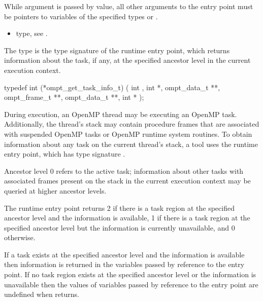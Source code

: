 \constraints
While argument  is passed by value, all other arguments 
to the entry point must be pointers to variables of the specified types or .

\crossreferences
\begin{itemize}
\item {} type, see .
\end{itemize}



\label{sec:ompt_get_task_info_t}
\label{sec:ompt_get_task_info}

\summary
The  type is the type signature of the 
 runtime entry point, which returns information 
about the task, if any, at the specified ancestor level in the current 
execution context.

\format
\begin{ccppspecific}
\begin{omptInquiry}
typedef int (*ompt_get_task_info_t) (
  int ,
  int *,
  ompt_data_t **,
  ompt_frame_t **,
  ompt_data_t **,
  int *
);
\end{omptInquiry}
\end{ccppspecific}

\descr
During execution, an OpenMP thread may be executing an OpenMP task.
Additionally, the thread's stack may contain procedure frames that 
are associated with suspended OpenMP tasks or OpenMP runtime system 
routines. To obtain information about any task on the current thread's 
stack, a tool uses the  runtime entry point,
which has type signature .

Ancestor level 0 refers to the active task; information about other 
tasks with associated frames present on the stack in the current execution 
context may be queried at higher ancestor levels.

The  runtime entry point returns 2 if there 
is a task region at the specified ancestor level and the information 
is available, 1 if there is a task region at the specified ancestor 
level but the information is currently unavailable, and 0 otherwise.

If a task exists at the specified ancestor level and the information is 
available then information is returned in the variables passed by reference 
to the entry point. If no task region exists at the specified ancestor level 
or the information is unavailable then the values of variables passed by 
reference to the entry point are undefined when  returns.

